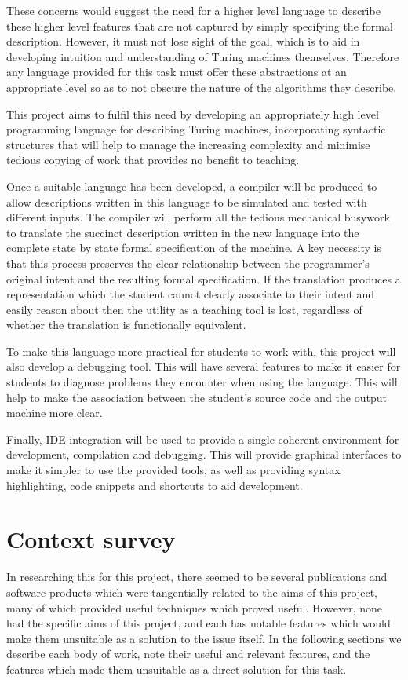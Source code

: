 \documentclass[11pt]{article}
\begin{document}
These concerns would suggest the need for a higher level language to describe these higher level features that are not captured by simply specifying the formal description. However, it must not lose sight of the goal, which is to aid in developing intuition and understanding of Turing machines themselves. Therefore any language provided for this task must offer these abstractions at an appropriate level so as to not obscure the nature of the algorithms they describe.

This project aims to fulfil this need by developing an appropriately high level programming language for describing Turing machines, incorporating syntactic structures that will help to manage the increasing complexity and minimise tedious copying of work that provides no benefit to teaching.

Once a suitable language has been developed, a compiler will be produced to allow descriptions written in this language to be simulated and tested with different inputs. The compiler will perform all the tedious mechanical busywork to translate the succinct description written in the new language into the complete state by state formal specification of the machine. A key necessity is that this process preserves the clear relationship between the programmer's original intent and the resulting formal specification. If the translation produces a representation which the student cannot clearly associate to their intent and easily reason about then the utility as a teaching tool is lost, regardless of whether the translation is functionally equivalent.

To make this language more practical for students to work with, this project will also develop a debugging tool. This will have several features to make it easier for students to diagnose problems they encounter when using the language. This will help to make the association between the student's source code and the output machine more clear.

Finally, IDE integration will be used to provide a single coherent environment for development, compilation and debugging. This will provide graphical interfaces to make it simpler to use the provided tools, as well as providing syntax highlighting, code snippets and shortcuts to aid development.

\section{Context survey}

In researching this for this project, there seemed to be several publications and software products which were tangentially related to the aims of this project, many of which provided useful techniques which proved useful. However, none had the specific aims of this project, and each has notable features which would make them unsuitable as a solution to the issue itself. In the following sections we describe each body of work, note their useful and relevant features, and the features which made them unsuitable as a direct solution for this task.
\end{document}
